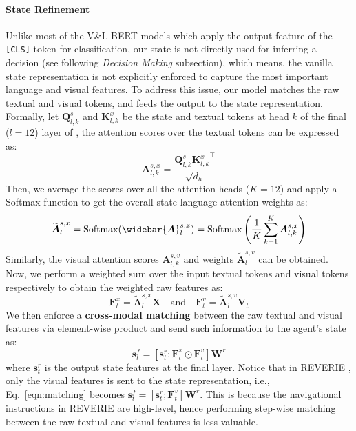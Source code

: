 \documentclass[final]{cvpr}
\begin{document}
\paragraph{State Refinement} 
Unlike most of the V\&L BERT models which apply the output feature of the \texttt{[CLS]} token for classification, our state is not directly used for inferring a decision (see following \textit{Decision Making} subsection), which means, the vanilla state representation is not explicitly enforced to capture the most important language and visual features. To address this issue, our model matches the raw textual and visual tokens, and feeds the output to the state representation. Formally, let $\boldsymbol{Q}^{s}_{l,k}$ and $\boldsymbol{K}^{x}_{l,k}$ be the state and textual tokens at head $k$ of the final ($l{=}12$) layer of \vlnbert, the attention scores over the textual tokens can be expressed as:
\begin{equation}
\boldsymbol{A}^{s,x}_{l,k} = \frac{\boldsymbol{Q}^{s}_{l,k}{\boldsymbol{K}^{x}_{l,k}}^{\!\top}}{\sqrt{d_h}}
\label{eqn:lang_attn}
\end{equation}
Then, we average the scores over all the attention heads ($K{=}12$) and apply a Softmax function to get the overall state-language attention weights as:
\begin{equation}
\widetilde{\boldsymbol{A}}^{s,x}_{l} = \text{Softmax}(\widebar{\boldsymbol{A}}^{s,x}_{l})= \text{Softmax}\left(\frac{1}{K}\sum^{K}_{k=1}\boldsymbol{A}^{s,x}_{l,k}\right)
\label{eqn:lang_weights}
\end{equation}
Similarly, the visual attention scores $\boldsymbol{A}^{s,v}_{l,k}$ and weights $\widetilde{\boldsymbol{A}}^{s,v}_{l}$ can be obtained.
Now, we perform a weighted sum over the input textual tokens and visual tokens respectively to obtain the weighted raw features as:
\begin{equation}
\boldsymbol{F}^{x}_{t} = \widetilde{\boldsymbol{A}}^{s,x}_{l}\boldsymbol{X}
\quad\text{and}\quad
\boldsymbol{F}^{v}_{t} = \widetilde{\boldsymbol{A}}^{s,v}_{l}\boldsymbol{V}_{\!t}
\label{eqn:weight_raw}
\end{equation}
We then enforce a \textbf{cross-modal matching} between the raw textual and visual features via element-wise product and send such information to the agent's state as:
\begin{equation}
\boldsymbol{s}^{f}_{t}=\left[\boldsymbol{s}^{r}_{t};\boldsymbol{F}^{x}_{t} \odot \boldsymbol{F}^{v}_{t}\right]\boldsymbol{W}^{r}
\label{eqn:matching}
\end{equation}
where $\boldsymbol{s}^{r}_{t}$ is the output state features at the final layer. Notice that in REVERIE \cite{qi2020reverie}, only the visual features is sent to the state representation, i.e., Eq.~\ref{eqn:matching} becomes $\boldsymbol{s}^{f}_{t}=\left[\boldsymbol{s}^{r}_{t};\boldsymbol{F}^{v}_{t}\right]\boldsymbol{W}^{r}$. This is because the navigational instructions in REVERIE are high-level, hence performing step-wise matching between the raw textual and visual features is less valuable.
\end{document}
